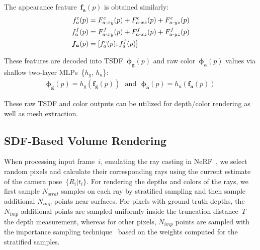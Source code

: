 The appearance feature~$\boldsymbol{f_{a}}(p)$ is obtained similarly:
\begin{align}
	f^{c}_{a}(p) &= F^{c}_{a\text{-}xy}(p) + F^{c}_{a\text{-}xz}(p) + F^{c}_{a\text{-}yz}(p) \notag \\
	f^{f}_{a}(p) &= F^{f}_{a\text{-}xy}(p) + F^{f}_{a\text{-}xz}(p) + F^{f}_{a\text{-}yz}(p) \notag \\
	\boldsymbol{f_{a}}(p) &= [f^{c}_{a}(p) ; f^{f}_{a}(p)]
\end{align}

These features are decoded into TSDF~$\boldsymbol{\phi_{g}}(p)$ and raw color~$\boldsymbol{\phi_{a}}(p)$ values via shallow two-layer MLPs~\{$h_{g}$, $h_{a}$\}:
\begin{align}
	\boldsymbol{\phi_{g}}(p) = h_{g}\left(\boldsymbol{f_{g}}(p)\right) \text{~~and~~} \boldsymbol{\phi_{a}}(p) = h_{a}\left(\boldsymbol{f_{a}}(p)\right)
\end{align}

These raw TSDF and color outputs can be utilized for depth/color rendering as well as mesh extraction.

\subsection{SDF-Based Volume Rendering} \label{sec:c4_rendering}

When processing input frame~$i$, emulating the ray casting in NeRF~\cite{mildenhall2020nerf}, we select random pixels and calculate their corresponding rays using the current estimate of the camera pose~$\{R_{i}| t_{i}\}$. For rendering the depths and colors of the rays, we first sample $N_{strat}$ samples on each ray by stratified sampling and then sample additional $N_{imp}$ points near surfaces. For pixels with ground truth depths, the $N_{imp}$ additional points are sampled uniformly inside the truncation distance~$T$ \wrt the depth measurement, whereas for other pixels, $N_{imp}$ points are sampled with the importance sampling technique~\cite{mildenhall2020nerf, martin2021nerf, wang2022go, sucar2021imap} based on the weights computed for the stratified samples.

